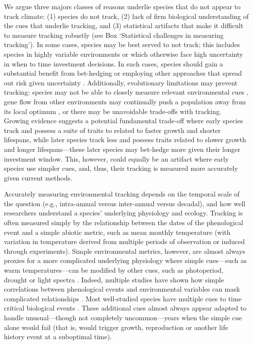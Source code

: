 \documentclass[11pt,letterpaper]{article}
\begin{document}
We argue three majors classes of reasons underlie species that do not appear to track climate: (1) species do not track, (2) lack of firm biological understanding of the cues that underlie tracking, and (3) statistical artifacts that make it difficult to measure tracking robustly (see Box `Statistical challenges in measuring tracking'). In some cases, species may be best served to not track; this includes species in highly variable environments or which otherwise face high uncertainty in when to time investment decisions. In such cases, species should gain a substantial benefit from bet-hedging or employing other approaches that spread out risk given uncertainty \citep{Venable:2007os,donald2013}. Additionally, evolutionary limitations may prevent tracking: species may not be able to closely measure relevant environmental cues \citep{arnold1992,Singer:2010eb}, gene flow from other environments may continually push a population away from its local optimum \citep{lenormand2002}, or there may be unavoidable trade-offs \citep{levins1968} with tracking.  Growing evidence suggests a potential fundamental trade-off where early species track and possess a suite of traits to related to faster growth and shorter lifespans, while later species track less and possess traits related to slower growth and longer lifespans---these later species may bet-hedge more given their longer investment window. This, however, could equally be an artifact where early species use simpler cues, and, thus, their tracking is measured more accurately given current methods. 

Accurately measuring environmental tracking depends on the temporal scale of the question (e.g., intra-annual versus inter-annual versus decadal), and how well researchers understand a species' underlying physiology and ecology. Tracking is often measured simply by the relationship between the dates of the phenological event and a simple abiotic metric, such as mean monthly temperature (with variation in temperature derived from multiple periods of observation or induced through experiments). Simple environmental metrics, however, are almost always proxies for a more complicated underlying physiology where simple cues---such as warm temperatures---can be modified by other cues, such as photoperiod, drought or light spectra \citep{Bagnall1993,Stinchcombe:2004ec}. Indeed, multiple studies have shown how simple correlations between phenological events and environmental variables can mask complicated relationships \citep{Cook:2012pnas,tansey2017}. Most well-studied species have multiple cues to time critical biological events \citep{chuinearees}. These additional cues almost always appear adapted to handle unusual---though not completely uncommon---years when the simple cue alone would fail (that is, would trigger growth, reproduction or another life history event at a suboptimal time). 
\end{document}
